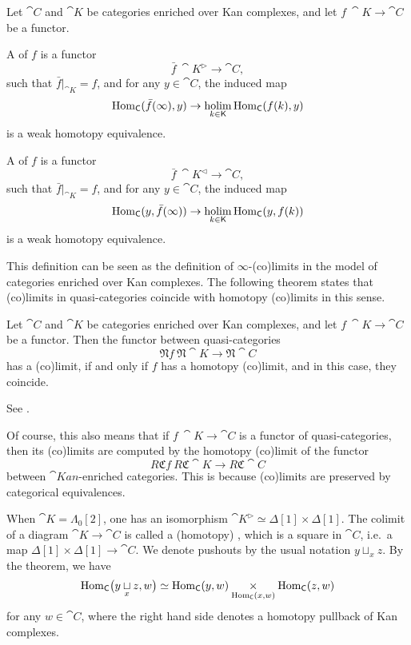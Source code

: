 \begin{definition}
    Let $\cat C$ and $\cat K$ be categories enriched over Kan complexes,
    and let $f\:\cat K\to\cat C$ be a functor.
    \begin{itms}
        \item A  of $f$ is a functor 
        \[ \bar f\:\cat K^\vartriangleright\to\cat C, \]
        such that $\bar f|_{\cat K}=f$, and for any $y\in\cat C$, the induced map 
        \[ \operatorname{Hom}_{\textup{\textsf{C}}}(\bar f(\infty),y)\to\mathop{\operatorname{holim}}\limits_{k\in\textup{\textsf{K}}}\operatorname{Hom}_{\textup{\textsf{C}}}(f(k),y) \]
        is a weak homotopy equivalence.

        \item A  of $f$ is a functor 
        \[ \bar f\:\cat K^\vartriangleleft\to\cat C, \]
        such that $\bar f|_{\cat K}=f$, and for any $y\in\cat C$, the induced map 
        \[ \operatorname{Hom}_{\textup{\textsf{C}}}(y,\bar f(\infty))\to\mathop{\operatorname{holim}}\limits_{k\in\textup{\textsf{K}}}\operatorname{Hom}_{\textup{\textsf{C}}}(y,f(k)) \]
        is a weak homotopy equivalence.
    \end{itms}
\end{definition}

This definition can be seen as the definition of $\infty$-(co)limits 
in the model of categories enriched over Kan complexes.
The following theorem states that
(co)limits in quasi-categories coincide with homotopy (co)limits in this sense.

\begin{theorem} \label{thm-6-x}
    Let $\cat C$ and $\cat K$ be categories enriched over Kan complexes,
    and let $f\:\cat K\to\cat C$ be a functor.
    Then the functor between quasi-categories
    \[ \mathfrak Nf\:\mathfrak N\cat K\to\mathfrak N\cat C \]
    has a (co)limit,
    if and only if $f$ has a homotopy (co)limit,
    and in this case, they coincide.
\end{theorem}

See \cite[Theorem~4.2.4.1]{htt}.

Of course, this also means that if $f\:\cat K\to\cat C$
is a functor of quasi-categories, then its (co)limits are computed by
the homotopy (co)limit of the functor
\[ R\mathfrak Cf\:R\mathfrak C\cat K\to R\mathfrak C\cat C \]
between $\cat{Kan}$-enriched categories.
This is because (co)limits are preserved by categorical equivalences.

\begin{example}
    When $\cat K=\Lambda_0[2]$, one has an isomorphism
    $\cat K^\vartriangleright\simeq\Delta[1]\times\Delta[1]$.
    The colimit of a diagram $\cat K\to\cat C$ is called a (homotopy) ,
    which is a square in $\cat C$, i.e.\ a map $\Delta[1]\times\Delta[1]\to\cat C$.
    We denote pushouts by the usual notation $y\sqcup_xz$.
    By the theorem, we have 
    \[ \operatorname{Hom}_{\textup{\textsf{C}}}\bigl(y\underset{x}{\sqcup}z,w\bigr)\simeq
    \operatorname{Hom}_{\textup{\textsf{C}}}(y,w)\underset{\operatorname{Hom}_{\textup{\textsf{C}}}(x,w)}{\times}\operatorname{Hom}_{\textup{\textsf{C}}}(z,w) \]
    for any $w\in\cat C$,
    where the right hand side denotes a homotopy pullback of Kan complexes. 
    \varqed
\end{example}

